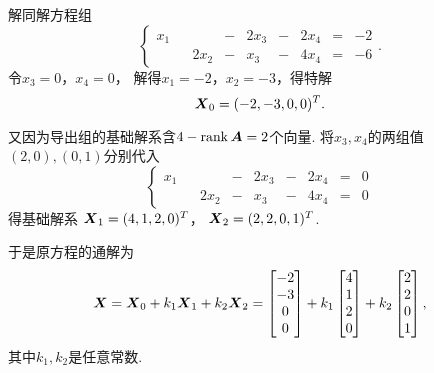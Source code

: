 \begin{example}
\begin{solution}
解同解方程组\[
	\left\{ \begin{array}{*{9}{c}}
		x_1 && &-& 2 x_3 &-& 2 x_4 &=& -2 \\
		&& 2 x_2 &-& x_3 &-& 4 x_4 &=& -6
	\end{array} \right..
\]
令\(x_3 = 0\)，\(x_4 = 0\)，
解得\(x_1 = -2\)，\(x_2 = -3\)，得特解\[
	\boldsymbol{X}_0 = (-2,-3,0,0)^T.
\]

又因为导出组的基础解系含\(4 - \rank\boldsymbol{A} = 2\)个向量.
将\(x_3,x_4\)的两组值\((2,0),(0,1)\)分别代入\[
	\left\{ \begin{array}{*{9}{c}}
		x_1 && &-& 2 x_3 &-& 2 x_4 &=& 0 \\
		&& 2 x_2 &-& x_3 &-& 4 x_4 &=& 0
	\end{array} \right.
\]
得基础解系
\(\boldsymbol{X}_1 = (4,1,2,0)^T\)，
\(\boldsymbol{X}_2 = (2,2,0,1)^T\).

于是原方程的通解为\[
	\boldsymbol{X} = \boldsymbol{X}_0 + k_1 \boldsymbol{X}_1 + k_2 \boldsymbol{X}_2
	= \begin{bmatrix} -2 \\ -3 \\ 0 \\ 0 \end{bmatrix}
	+ k_1 \begin{bmatrix} 4 \\ 1 \\ 2 \\ 0 \end{bmatrix}
	+ k_2 \begin{bmatrix} 2 \\ 2 \\ 0 \\ 1 \end{bmatrix},
\]
其中\(k_1,k_2\)是任意常数.
\end{solution}
\end{example}

